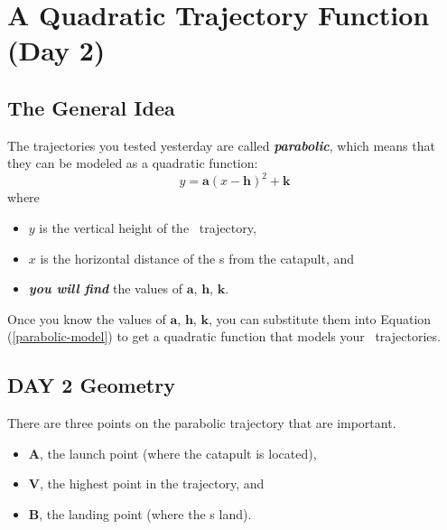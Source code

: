 \newpage 
\section{A Quadratic Trajectory Function (Day 2)}






\subsection{The General Idea}

The trajectories you tested yesterday are called {\bfseries\itshape parabolic},
which means that they can be modeled as a quadratic function:
\begin{equation}\label{parabolic-model}
    y = \bm{a}(x-\bm{h})^2 + \bm{k}
\end{equation} 
where 
\begin{itemize}[nosep]
    \item $y$ is the vertical height of the \mymm~trajectory, 
    \item $x$ is the horizontal distance of the \mymm{}s from the catapult, and
    \item {\bfseries\itshape you will find} the values of $\bm{a}$, $\bm{h}$, $\bm{k}$.
\end{itemize}

Once you know the values of $\bm{a}$, $\bm{h}$, $\bm{k}$, 
you can substitute them into Equation (\ref{parabolic-model}) to get a 
quadratic function that models your \mymm~trajectories.





\subsection{DAY 2 Geometry}

There are three points on the parabolic trajectory that are important.
\begin{itemize}[nosep]
    \item $\bm{A}$, the launch point (where the catapult is located),
    \item $\bm{V}$, the highest point in the trajectory, and
    \item $\bm{B}$, the landing point (where the \mymm{}s land). 
\end{itemize}

